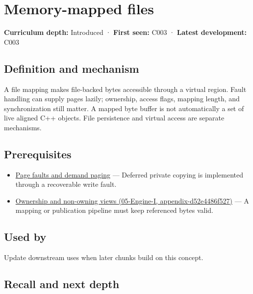 \hypertarget{appendix-313ee7a0ba7b}{}
\section{Memory-mapped files}\label{appendix-313ee7a0ba7b-memory-mapped-files}

\textbf{Curriculum depth:} Introduced · \textbf{First seen:} C003 · \textbf{Latest development:} C003

\subsection{Definition and mechanism}\label{appendix-313ee7a0ba7b-definition-and-mechanism}

A file mapping makes file-backed bytes accessible through a virtual region. Fault handling can supply pages lazily; ownership, access flags, mapping length, and synchronization still matter. A mapped byte buffer is not automatically a set of live aligned C++ objects. File persistence and virtual access are separate mechanisms.

\subsection{Prerequisites}\label{appendix-313ee7a0ba7b-prerequisites}

\begin{itemize}
\tightlist
\item
  \hyperref[appendix-cc0909a7ef14]{Page faults and demand paging} --- Deferred private copying is implemented through a recoverable write fault.
\item
  \href{../05-Engine-I/main.pdf\#nameddest=appendix-d52e4486f527}{Ownership and non-owning views (05-Engine-I, appendix-d52e4486f527)} --- A mapping or publication pipeline must keep referenced bytes valid.
\end{itemize}

\subsection{Used by}\label{appendix-313ee7a0ba7b-used-by}

Update downstream uses when later chunks build on this concept.

\subsection{Recall and next depth}\label{appendix-313ee7a0ba7b-recall-and-next-depth}


